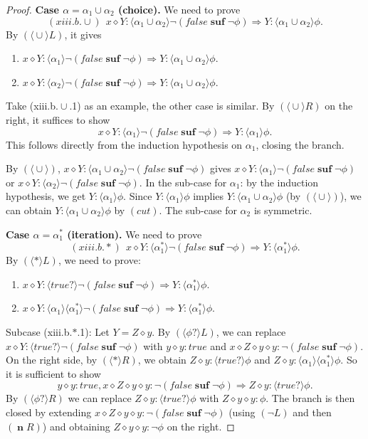 \documentclass[manuscript,screen]{acmart}
\newcommand{\la}[0]{\langle}
\newcommand{\ra}[0]{\rangle}
\newcommand{\true}[0]{\mathit{true}}
\newcommand{\false}[0]{\mathit{false}}
\DeclareMathOperator{\cho}{\cup}
\newcommand{\lup}[0]{*}
\newcommand{\cat}[0]{\diamond}
\DeclareMathOperator{\osuf}{\mathbf{suf}}
\DeclareMathOperator{\nxt}{\mathbf{n}}
\begin{document}
\begin{proof}
\textbf{Case $\alpha = \alpha_1\cho\alpha_2$ (choice).} 
We need to prove
$$
(xiii.b.\cho)\ \ x\cat Y : \la\alpha_1\cup\alpha_2\ra\neg(\false\osuf\neg\phi)\Rightarrow Y : \la\alpha_1\cup\alpha_2\ra\phi. 
$$
By $(\la\cho\ra L)$, it gives
\begin{enumerate}
\item[(xiii.b.$\cho$.1)] $x\cat Y : \la\alpha_1\ra\neg(\false\osuf\neg\phi)\Rightarrow Y : \la\alpha_1\cup\alpha_2\ra\phi$.
\item[(xiii.b.$\cho$.2)] $x\cat Y : \la\alpha_2\ra\neg(\false\osuf\neg\phi)\Rightarrow Y : \la\alpha_1\cup\alpha_2\ra\phi$.
\end{enumerate}
Take (xiii.b.$\cho$.1) as an example, the other case is similar. 
By $(\la\cho\ra R)$ on the right, it suffices to show $$x\cat Y : \la\alpha_1\ra\neg(\false\osuf\neg\phi)\Rightarrow Y : \la\alpha_1\ra\phi.$$ 
This follows directly from the induction hypothesis on $\alpha_1$, closing the branch. 


\ifx
By $(\la\cho\ra)$, $x\cat Y : \la\alpha_1\cho\alpha_2\ra\neg(\false\osuf\neg\phi)$ gives $x\cat Y : \la\alpha_1\ra\neg(\false\osuf\neg\phi)$ or $x\cat Y : \la\alpha_2\ra\neg(\false\osuf\neg\phi)$. In the sub-case for $\alpha_1$: by the induction hypothesis, we get $Y : \la\alpha_1\ra\phi$. Since $Y : \la\alpha_1\ra\phi$ implies $Y : \la\alpha_1\cho\alpha_2\ra\phi$ (by $(\la\cho\ra)$), we can obtain $Y : \la\alpha_1\cho\alpha_2\ra\phi$ by $(cut)$. The sub-case for $\alpha_2$ is symmetric.
\fi

\textbf{Case $\alpha = \alpha_1^*$ (iteration).} 
We need to prove
$$
(xiii.b.*)\ \ x\cat Y : \la\alpha^*_1\ra\neg(\false\osuf\neg\phi)\Rightarrow Y : \la\alpha^*_1\ra\phi.
$$
By $(\la\lup\ra L)$, %
we need to prove:
\begin{enumerate}
\item[(xiii.b.$*$.1)] $x\cat Y : \la\true?\ra\neg(\false\osuf\neg\phi)\Rightarrow Y:\la\alpha^*_1\ra\phi$.
\item[(xiii.b.$*$.2)] $x\cat Y : \la\alpha_1\ra\la\alpha_1^*\ra\neg(\false\osuf\neg\phi)\Rightarrow Y:\la\alpha^*_1\ra\phi$.
\end{enumerate}

Subcase (xiii.b.$*$.1): Let $Y = Z\cat y$. By $(\la\phi?\ra L)$, we can replace $x\cat Y : \la\true?\ra\neg(\false\osuf\neg\phi)$ with $y\cat y : \true$ and $x\cat Z\cat y\cat y : \neg(\false\osuf\neg\phi)$. 
On the right side, by $(\la \lup\ra R)$, we obtain $Z\cat y : \la\true?\ra\phi$ and $Z\cat y: \la\alpha_1\ra\la\alpha^*_1\ra\phi$. 
So it is sufficient to show
$$
y\cat y : \true, x\cat Z\cat y\cat y : \neg(\false\osuf\neg\phi)\Rightarrow Z\cat y : \la\true?\ra\phi.
$$
By $(\la\phi?\ra R)$ we can replace $Z\cat y : \la\true?\ra\phi$ with $Z\cat y\cat y : \phi$. 
The branch is then closed by extending $x\cat Z\cat y\cat y : \neg(\false\osuf\neg\phi)$ (using $(\neg L)$ and then $(\nxt R)$) and obtaining $Z\cat y\cat y: \neg\phi$ on the right. 


\end{proof}
\end{document}
